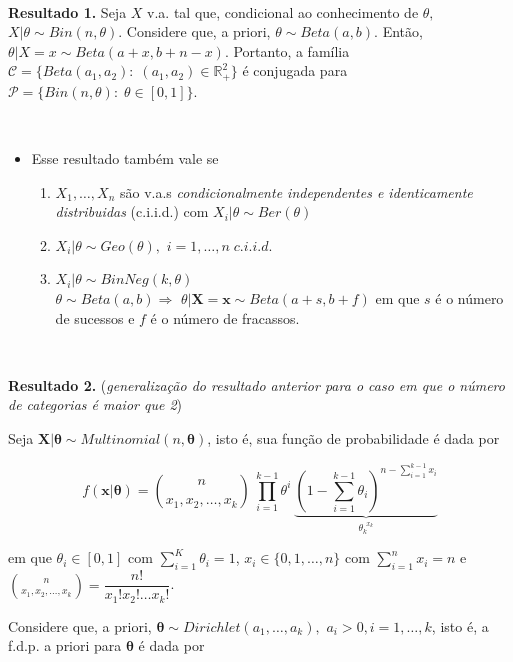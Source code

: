 \documentclass[
]{book}
\providecommand{\tightlist}{%
  \setlength{\itemsep}{0pt}\setlength{\parskip}{0pt}}
\begin{document}
\(~\)

\textbf{Resultado 1.} Seja \(X\) v.a. tal que, condicional ao conhecimento de \(\theta,\) \(X|\theta \sim Bin(n,\theta).\) Considere que, a priori, \(\theta \sim Beta(a,b).\) Então, \(\theta|X=x \sim Beta(a+x,b+n-x).\) Portanto, a família \(\mathcal{C}=\{Beta(a_1,a_2):\;(a_1,a_2)\in \mathbb{R}^2_+\}\) é conjugada para \(\mathcal{P}=\{Bin(n,\theta):\;\theta \in [0,1]\}.\)

\(~\)

\begin{itemize}
\tightlist
\item
  Esse resultado também vale se

  \begin{enumerate}
  \def\labelenumi{\arabic{enumi}.}
  \tightlist
  \item
    \(X_1,\ldots,X_n\) são v.a.s \emph{condicionalmente independentes e identicamente distribuidas} (c.i.i.d.) com \(X_i|\theta \sim Ber(\theta)\)\\
  \item
    \(X_i|\theta\sim Geo(\theta),\) \(i=1,\ldots,n \; c.i.i.d.\)\\
  \item
    \(X_i|\theta \sim BinNeg(k,\theta)\)\\
    \(\theta\sim Beta(a,b)\Rightarrow\) \(\theta|\boldsymbol X=\boldsymbol x \sim Beta(a+s,b+f)\) em que \(s\) é o número de sucessos e \(f\) é o número de fracassos.
  \end{enumerate}
\end{itemize}

\(~\)

\textbf{Resultado 2.} (\emph{generalização do resultado anterior para o caso em que o número de categorias é maior que 2})

Seja \(\boldsymbol X | \boldsymbol \theta \sim Multinomial(n,\boldsymbol \theta)\), isto é, sua função de probabilidade é dada por

\[f(\boldsymbol x| \boldsymbol \theta)= \binom{n}{x_1,x_2,\ldots,x_k}~\prod_{i=1}^{k-1}\theta^i~\underbrace{\left(1-\sum_{i=1}^{k-1}\theta_i\right)^{\displaystyle n-\sum_{i=1}^{k-1}x_i}}_{\displaystyle \theta_k^{~~x_k}}\]

em que \(\theta_i\in [0,1]\) com \(\sum_{i=1}^K\theta_i=1\), \(x_i \in \{0,1,\ldots,n\}\) com \(\sum_{i=1}^nx_i=n\) e \(\displaystyle \binom{n}{x_1,x_2,\ldots,x_k}=\dfrac{n!}{x_1!x_2!\ldots x_k!}\).

Considere que, a priori, \(\boldsymbol \theta \sim Dirichlet(a_1,\ldots,a_k),\) \(a_i > 0, i=1,\ldots,k\), isto é, a f.d.p. a priori para \(\boldsymbol \theta\) é dada por
\end{document}
